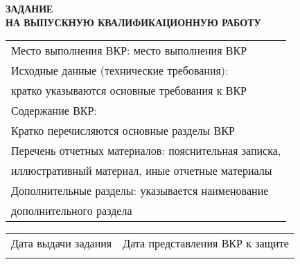 \begin{center}
	\textbf{
		ЗАДАНИЕ \\
		НА ВЫПУСКНУЮ КВАЛИФИКАЦИОННУЮ РАБОТУ
	}

	\vspace*{2cm}

	\confirmation

	\vspace*{3cm}
	
	\worktitle
	\begin{tabularx}{\textwidth}{ X }
		Место выполнения ВКР: место выполнения ВКР \\
		Исходные данные (технические требования): \\
		кратко указываются основные требования к ВКР \\
		Содержание ВКР: \\
		Кратко перечисляются основные разделы ВКР \\
		Перечень отчетных материалов: пояснительная записка, \\ иллюстративный материал, иные отчетные материалы \\
		Дополнительные разделы: указывается наименование \\ дополнительного раздела
	\end{tabularx}

	\vspace*{2cm}
	
	\begin{tabularx}{\textwidth}{ X X }
		Дата выдачи задания & Дата представления ВКР к защите \\
		\emptydate & \emptydate
	\end{tabularx}

	\vspace*{3cm}

	\subsblock
\end{center}

\clearpage

